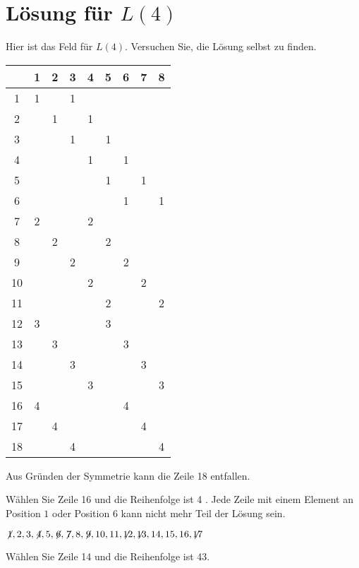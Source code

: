 \newpage

\section{Lösung für $L(4)$}\label{s.langford-four}


Hier ist das Feld für $L(4)$. Versuchen Sie, die Lösung selbst zu finden.
\begin{center}
\addtolength{\tabcolsep}{4pt}
\begin{tabular}{|c||c|c|c|c|c|c|c|c|}
\hline
&1&2&3&4&5&6&7&8\\\hline\hline
1&1&&1&&&&&\\\hline
2&&1&&1&&&&\\\hline
3&&&1&&1&&&\\\hline
4&&&&1&&1&&\\\hline
5&&&&&1&&1&\\\hline
6&&&&&&1&&1\\\hline
7&2&&&2&&&&\\\hline
8&&2&&&2&&&\\\hline
9&&&2&&&2&&\\\hline
10&&&&2&&&2&\\\hline
11&&&&&2&&&2\\\hline
12&3&&&&3&&&\\\hline
13&&3&&&&3&&\\\hline
14&&&3&&&&3&\\\hline
15&&&&3&&&&3\\\hline
16&4&&&&&4&&\\\hline
17&&4&&&&&4&\\\hline
18&&&4&&&&&4\\\hline
\end{tabular}
\end{center}
Aus Gründen der Symmetrie kann die Zeile 18 entfallen.

\smallskip

\noindent Wählen Sie Zeile 16 und die Reihenfolge ist 4\textvisiblespace\textvisiblespace\textvisiblespace{} \textvisiblespace\textvisiblespace.
Jede Zeile mit einem Element an Position $1$ oder Position $6$ kann nicht mehr Teil der Lösung sein.

$\not\! 1,2,3,\not\! 4,5,\not\! 6,\not\! 7,8,\not\! 9,10,11,\not\!\! 12,\not\!\! 13,14,15,16,\not\!\! 17$

\noindent Wählen Sie Zeile 14 und die Reihenfolge ist 4\textvisiblespace{}3\textvisiblespace.

